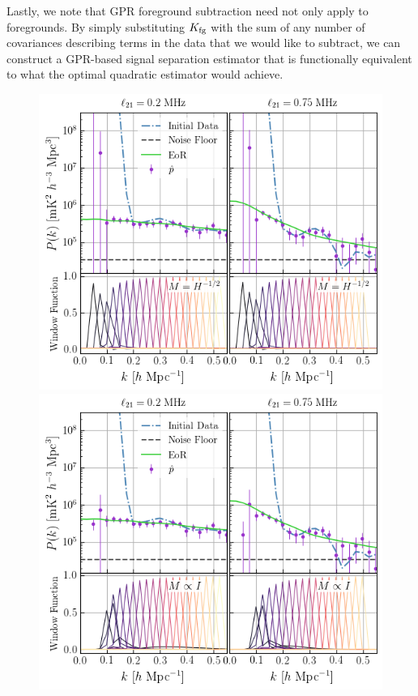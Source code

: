 \documentclass[a4paper,fleqn,usenatbib]{mnras}
\def\Kfg{K_{\rm fg}}
\begin{document}
Lastly, we note that GPR foreground subtraction need not only apply to foregrounds.
By simply substituting $\Kfg$ with the sum of any number of covariances describing terms in the data that we would like to subtract, we can construct a GPR-based signal separation estimator that is functionally equivalent to what the optimal quadratic estimator would achieve.

\begin{figure}
\centering
\includegraphics[scale=0.6]{imgs/gpr_window_low_noise_M_F12}
\includegraphics[scale=0.6]{imgs/gpr_window_low_noise_M_I}

\end{figure}
\end{document}
